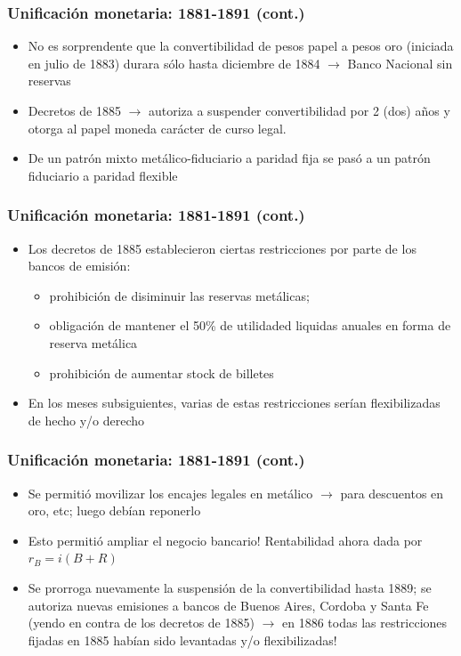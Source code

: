 \documentclass[14pt,aspectratio=169]{beamer}
\begin{document}
\begin{frame}\frametitle{Unificación monetaria: 1881-1891 (cont.)}
     \begin{itemize}
     \item No es sorprendente que la convertibilidad de pesos papel a
       pesos oro (iniciada en julio de 1883) durara sólo hasta
       diciembre de 1884 $\longrightarrow$ Banco Nacional sin reservas
       \item Decretos de 1885 $\longrightarrow$ autoriza a
         suspender convertibilidad por 2 (dos) años y otorga al papel
         moneda carácter de curso legal.
         \item De un patrón mixto metálico-fiduciario a paridad fija se pasó a un
           patrón fiduciario a paridad flexible
         \end{itemize}
        \end{frame}
        


\begin{frame}\frametitle{Unificación monetaria: 1881-1891 (cont.)}
     \begin{itemize}
     \item Los decretos de 1885 establecieron ciertas restricciones
       por parte de los bancos de emisión:
       \begin{itemize}\itemsep 10pt \medskip
       \item prohibición de disiminuir las reservas metálicas;
         \item obligación de mantener el 50\% de utilidaded liquidas
           anuales en forma de reserva metálica
           \item prohibición de aumentar stock de billetes 
           \end{itemize}
           \item En los meses subsiguientes, varias de estas
             restricciones serían flexibilizadas de hecho y/o derecho
         \end{itemize}
        \end{frame}

        

\begin{frame}\frametitle{Unificación monetaria: 1881-1891 (cont.)}
     \begin{itemize}
     \item Se permitió movilizar los encajes legales en
       metálico $\longrightarrow$ para descuentos en oro, etc; luego
       debían reponerlo
       \item Esto permitió ampliar el negocio bancario! Rentabilidad
         ahora dada por $r_{B}=i(B+R)$
         \item Se prorroga nuevamente la suspensión de la
           convertibilidad hasta 1889; se autoriza nuevas emisiones a bancos de Buenos Aires, Cordoba y Santa Fe (yendo en contra de los decretos de 1885) $\longrightarrow$ en 1886 todas
           las restricciones fijadas en 1885 habían sido levantadas
           y/o flexibilizadas!
         \end{itemize}
        \end{frame}
        
\end{document}
